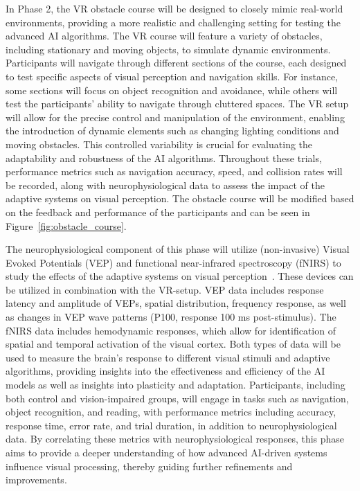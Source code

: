 \documentclass[10pt]{article}
\begin{document}
In Phase 2, the VR obstacle course will be designed to closely mimic real-world
environments, providing a more realistic and challenging setting for testing the
advanced AI algorithms. The VR course will feature a variety of obstacles,
including stationary and moving objects, to simulate dynamic environments.
Participants will navigate through different sections of the course, each
designed to test specific aspects of visual perception and navigation skills.
For instance, some sections will focus on object recognition and avoidance,
while others will test the participants' ability to navigate through cluttered
spaces. The VR setup will allow for the precise control and manipulation of the
environment, enabling the introduction of dynamic elements such as changing
lighting conditions and moving obstacles. This controlled variability is crucial
for evaluating the adaptability and robustness of the AI algorithms. Throughout
these trials, performance metrics such as navigation accuracy, speed, and
collision rates will be recorded, along with neurophysiological data to assess
the impact of the adaptive systems on visual perception. The obstacle course
will be modified based on the feedback and performance of the participants and
can be seen in Figure~\ref{fig:obstacle_course}.

The neurophysiological component of this phase will utilize (non-invasive)
Visual Evoked Potentials (VEP) and functional near-infrared spectroscopy (fNIRS)
to study the effects of the adaptive systems on visual
perception~\parencite{martinez-cagigalBrainComputerInterfaces2021,klistornerAnalysisMultifocalVisual2022,chenNeuralCorrelatesObstacle2017}.
These devices can be utilized in combination with the VR-setup. VEP data
includes response latency and amplitude of VEPs, spatial distribution, frequency
response, as well as changes in VEP wave patterns (P100, response 100 ms
post-stimulus). The fNIRS data includes hemodynamic responses, which allow for
identification of spatial and temporal activation of the visual cortex. Both
types of data will be used to measure the brain's response to different visual
stimuli and adaptive algorithms, providing insights into the effectiveness and
efficiency of the AI models as well as insights into plasticity and adaptation.
Participants, including both control and vision-impaired groups, will engage in
tasks such as navigation, object recognition, and reading, with performance
metrics including accuracy, response time, error rate, and trial duration, in
addition to neurophysiological data. By correlating these metrics with
neurophysiological responses, this phase aims to provide a deeper understanding
of how advanced AI-driven systems influence visual processing, thereby guiding
further refinements and improvements.
\end{document}
